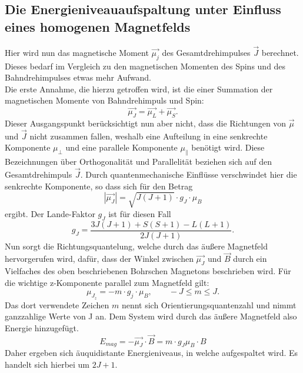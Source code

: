 \subsection{Die Energieniveauaufspaltung unter Einfluss eines homogenen Magnetfelds}
Hier wird nun das magnetische Moment $\vec{\mu_j}$ des Gesamtdrehimpulses $\vec{J}$ berechnet. Dieses bedarf im Vergleich zu den magnetischen Momenten des Spins und des Bahndrehimpulses etwas mehr Aufwand.\\
Die erste Annahme, die hierzu getroffen wird, ist die einer Summation der magnetischen Momente von Bahndrehimpuls und Spin:
\begin{equation}
    \vec{\mu_J}=\vec{\mu_L}+\vec{\mu_S}.
\end{equation}
Dieser Ausgangspunkt berücksichtigt nun aber nicht, dass die Richtungen von $\vec{\mu}$ und $\vec{J}$ nicht zusammen fallen, weshalb eine Aufteilung in eine senkrechte Komponente $\mu_\perp$ und eine parallele Komponente $\mu_\parallel$ benötigt wird. Diese Bezeichnungen über Orthogonalität und Parallelität beziehen sich auf den Gesamtdrehimpuls $\vec{J}$. Durch quantenmechanische Einflüsse verschwindet hier die senkrechte Komponente, so dass sich für den Betrag 
\begin{equation}
    |\vec{\mu_J}|=\sqrt{J(J+1)}\cdot g_J\cdot \mu_B
\end{equation}
ergibt. Der Lande-Faktor $g_J$ ist für diesen Fall
\begin{equation}
    g_J=\frac{3J(J+1)+S(S+1)-L(L+1)}{2J(J+1)}.
\end{equation}
Nun sorgt die Richtungsquantelung, welche durch das äußere Magnetfeld hervorgerufen wird, dafür, dass der Winkel zwischen $\vec{\mu_J}$ und $\vec{B}$ durch ein Vielfaches des oben beschriebenen Bohrschen Magnetons beschrieben wird. Für die wichtige z-Komponente parallel zum Magnetfeld gilt:
\begin{equation}
    \mu_{J_z}=-m\cdot g_j\cdot\mu_B,\qquad -J\leq m\leq J.
\end{equation}
Das dort verwendete Zeichen $m$ nennt sich Orientierungsquantenzahl und nimmt ganzzahlige Werte von J an. Dem System wird durch das äußere Magnetfeld also Energie hinzugefügt.
\begin{equation}
    E_{mag}=-\vec{\mu_J}\cdot\vec{B}=m\cdot g_J\mu_B\cdot B
\end{equation}
Daher ergeben sich äuquidistante Energieniveaus, in welche aufgespaltet wird. Es handelt sich hierbei um $2J+1$. 
